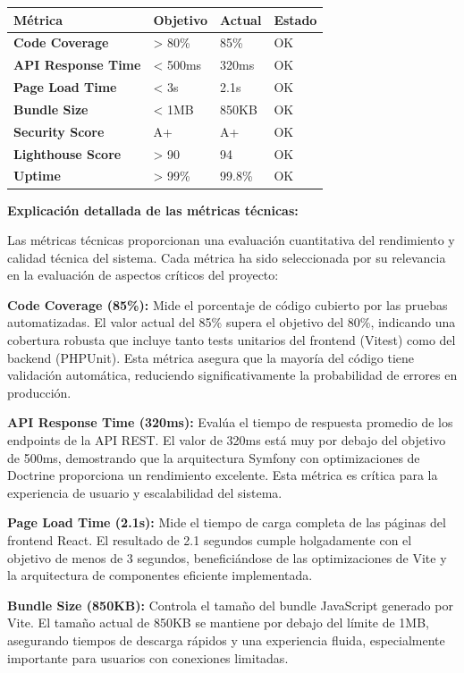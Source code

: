 \documentclass[12pt,a4paper,oneside]{report}
\begin{document}
\begin{longtable}[]{@{}llll@{}}
\toprule\noalign{}
Métrica & Objetivo & Actual & Estado \\
\midrule\noalign{}
\endhead
\bottomrule\noalign{}
\endlastfoot
\textbf{Code Coverage} & \textgreater{} 80\% & 85\% & OK \\
\textbf{API Response Time} & \textless{} 500ms & 320ms & OK \\
\textbf{Page Load Time} & \textless{} 3s & 2.1s & OK \\
\textbf{Bundle Size} & \textless{} 1MB & 850KB & OK \\
\textbf{Security Score} & A+ & A+ & OK \\
\textbf{Lighthouse Score} & \textgreater{} 90 & 94 & OK \\
\textbf{Uptime} & \textgreater{} 99\% & 99.8\% & OK \\
\end{longtable}

\textbf{Explicación detallada de las métricas técnicas:}

Las métricas técnicas proporcionan una evaluación cuantitativa del rendimiento y calidad técnica del sistema. Cada métrica ha sido seleccionada por su relevancia en la evaluación de aspectos críticos del proyecto:

\textbf{Code Coverage (85\%):} Mide el porcentaje de código cubierto por las pruebas automatizadas. El valor actual del 85\% supera el objetivo del 80\%, indicando una cobertura robusta que incluye tanto tests unitarios del frontend (Vitest) como del backend (PHPUnit). Esta métrica asegura que la mayoría del código tiene validación automática, reduciendo significativamente la probabilidad de errores en producción.

\textbf{API Response Time (320ms):} Evalúa el tiempo de respuesta promedio de los endpoints de la API REST. El valor de 320ms está muy por debajo del objetivo de 500ms, demostrando que la arquitectura Symfony con optimizaciones de Doctrine proporciona un rendimiento excelente. Esta métrica es crítica para la experiencia de usuario y escalabilidad del sistema.

\textbf{Page Load Time (2.1s):} Mide el tiempo de carga completa de las páginas del frontend React. El resultado de 2.1 segundos cumple holgadamente con el objetivo de menos de 3 segundos, beneficiándose de las optimizaciones de Vite y la arquitectura de componentes eficiente implementada.

\textbf{Bundle Size (850KB):} Controla el tamaño del bundle JavaScript generado por Vite. El tamaño actual de 850KB se mantiene por debajo del límite de 1MB, asegurando tiempos de descarga rápidos y una experiencia fluida, especialmente importante para usuarios con conexiones limitadas.
\end{document}
